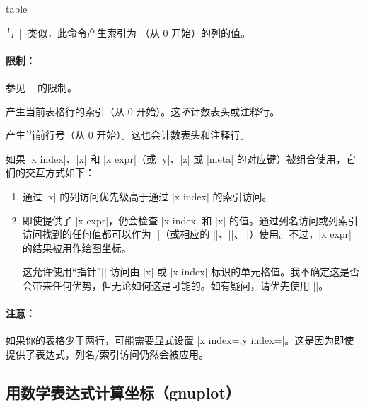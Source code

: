 {\begin{addplotoperation}[]{table}{}
    \begin{command}{\thisrowno{}}
        与 |\thisrow| 类似，此命令产生索引为 （从 $0$ 开始）的列的值。


        \paragraph{限制：}

        参见 |\thisrow| 的限制。
    \end{command}

    \begin{command}{\coordindex}
        产生当前表格行的索引（从 $0$ 开始）。这\emph{不}计数表头或注释行。
    \end{command}

    \begin{command}{\lineno}
        产生当前行号（从 $0$ 开始）。这也会计数表头和注释行。
    \end{command}

    如果 |x index|、|x| 和 |x expr|（或 |y|、|z| 或 |meta| 的对应键）被组合使用，它们的交互方式如下：
    \begin{enumerate}
        \item 通过 |x| 的列访问优先级高于通过 |x index| 的索引访问。
        \item 即使提供了 |x expr|，仍会检查 |x index| 和 |x| 的值。通过列名访问或列索引访问找到的任何值都可以作为 |\columnx|（或相应的 |\columny|、|\columnz|、|\columnmeta|）使用。不过，|x expr| 的结果被用作绘图坐标。

            这允许使用“指针”|\columnx| 访问由 |x| 或 |x index| 标识的单元格值。我不确定这是否会带来任何优势，但无论如何这是可能的。如有疑问，请优先使用 |\thisrow|。
    \end{enumerate}

    \paragraph{注意：}

    如果你的表格少于两行，可能需要显式设置 |x index={},y index={}|。这是因为即使提供了表达式，列名/索引访问仍然会被应用。
\end{addplotoperation}


\subsection{用数学表达式计算坐标（gnuplot）}

}
